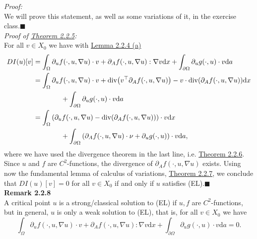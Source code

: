\textit{Proof:}\\
We will prove this statement, as well as some variations of it, in the exercise class.\hfill$\blacksquare$\\[11pt]

\textit{Proof of \hyperlink{theorem_2_2_5}{Theorem 2.2.5}:}\\
For all $v\in X_0$ we have with \hyperlink{lemma_2_2_4}{Lemma 2.2.4 (a)}
\begin{align*}
	DI(u)[v]&=\int_\Omega{\partial_uf(\cdot,u,\nabla u)\cdot v+\partial_Af(\cdot,u,\nabla u):\nabla v\mathrm{d}x}+\int_{\partial\Omega}{\partial_ug(\cdot,u)\cdot v\mathrm{d}a}\\
	&=\int_\Omega{\partial_uf(\cdot,u,\nabla u)\cdot v+\operatorname{div}\mathopen{}\left(v^\top\partial_Af(\cdot,u,\nabla u)\right)\mathclose{}-v\cdot\operatorname{div}\mathopen{}\left(\partial_Af(\cdot,u,\nabla u)\right)\mathclose{}\mathrm{d}x}\\
	&\qquad\qquad+\int_{\partial\Omega}{\partial_ug(\cdot,u)\cdot v\mathrm{d}a}\\
	&=\int_\Omega{\left(\partial_uf(\cdot,u,\nabla u)-\operatorname{div}\mathopen{}\left(\partial_Af(\cdot,u,\nabla u)\right)\mathclose{}\right)\cdot v\mathrm{d}x}\\
	&\qquad\qquad+\int_{\partial\Omega}{\left(\partial_Af(\cdot,u,\nabla u)\cdot\nu+\partial_ug(\cdot,u)\right)\cdot v\mathrm{d}a},
\end{align*}
where we have used the divergence theorem in the last line, i.e. \hyperlink{theorem_2_2_6}{Theorem 2.2.6}. Since $u$ and $f$ are $C^2$-functions, the divergence of $\partial_Af(\cdot,u,\nabla u)$ exists. Using now the fundamental lemma of calculus of variations, \hyperlink{theorem_2_2_7}{Theorem 2.2.7}, we conclude that $DI(u)[v]=0$ for all $v\in X_0$ if and only if $u$ satisfies (EL).\hfill$\blacksquare$\\[11pt]

\textbf{Remark 2.2.8}\\
A critical point $u$ is a strong/classical solution to (EL) if $u,f$ are $C^2$-functions, but in general, $u$ is only a weak solution to (EL), that is, for all $v\in X_0$ we have
\[\int_\Omega{\partial_uf(\cdot,u,\nabla u)\cdot v+\partial_Af(\cdot,u,\nabla u):\nabla v\mathrm{d}x}+\int_{\partial\Omega}{\partial_ug(\cdot,u)\cdot v\mathrm{d}a}=0.\]\\

